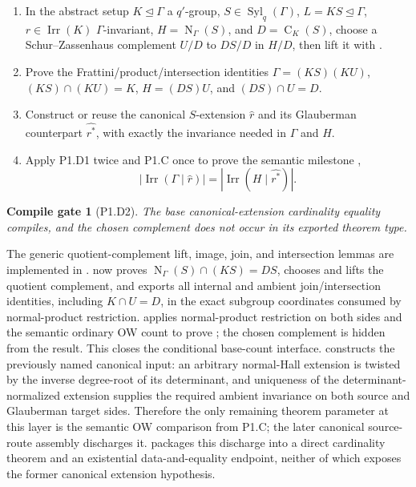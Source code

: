\documentclass[11pt]{article}
\newtheorem{gate}{Compile gate}
\newcommand{\Irr}{\operatorname{Irr}}
\newcommand{\Norm}{\operatorname{N}}
\newcommand{\Cent}{\operatorname{C}}
\newcommand{\Syl}{\operatorname{Syl}}
\begin{document}
\begin{enumerate}[label=\textbf{P1.D2.\arabic*.},leftmargin=*]
  \item In the abstract setup
  \(K\trianglelefteq\Gamma\) a \(q'\)-group,
  \(S\in\Syl_q(\Gamma)\), \(L=KS\trianglelefteq\Gamma\),
  \(r\in\Irr(K)\) \(\Gamma\)-invariant,
  \(H=\Norm_\Gamma(S)\), and \(D=\Cent_K(S)\), choose a
  Schur--Zassenhaus complement \(U/D\) to \(DS/D\) in \(H/D\), then lift
  it with .
  \item Prove the Frattini/product/intersection identities
  \(\Gamma=(KS)(KU)\), \((KS)\cap(KU)=K\),
  \(H=(DS)U\), and \((DS)\cap U=D\).
  \item Construct or reuse the canonical \(S\)-extension \(\widehat r\)
  and its Glauberman counterpart \(\widehat{r^*}\), with exactly the
  invariance needed in \(\Gamma\) and \(H\).
  \item Apply P1.D1 twice and P1.C once to prove the semantic milestone
  ,
  \[
    |\Irr(\Gamma\mid\widehat r)|
      =|\Irr(H\mid\widehat{r^*})|.
  \]
\end{enumerate}

\begin{gate}[P1.D2]
The base canonical-extension cardinality equality compiles, and the chosen
complement does not occur in its exported theorem type.
\end{gate}

The generic quotient-complement lift, image, join, and intersection
lemmas are implemented in .
 now proves
\(\Norm_\Gamma(S)\cap(KS)=DS\), chooses and lifts the quotient complement,
and exports all internal and ambient join/intersection identities,
including \(K\cap U=D\), in the exact subgroup coordinates consumed by
normal-product restriction.
 applies normal-product
restriction on both sides and the semantic ordinary OW count to prove
; the chosen
complement is hidden from the result.  This closes the conditional
base-count interface.
 constructs the
previously named canonical input: an arbitrary normal-Hall extension is
twisted by the inverse degree-root of its determinant, and uniqueness of
the determinant-normalized extension supplies the required ambient
invariance on both source and Glauberman target sides.  Therefore the only
remaining theorem parameter at this layer is the semantic OW comparison
from P1.C; the later canonical source-route assembly discharges it.
 packages this
discharge into a direct cardinality theorem and an existential
data-and-equality endpoint, neither of which exposes the former canonical
extension hypothesis.
\end{document}
